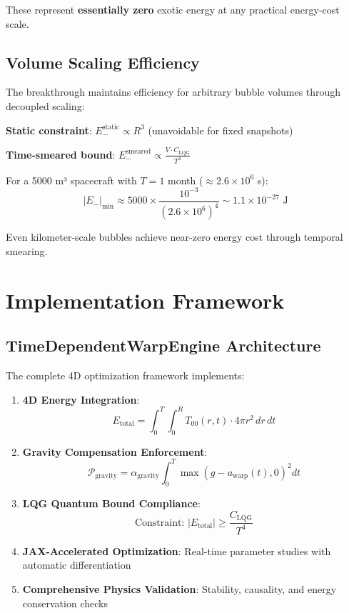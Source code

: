 \documentclass[12pt,a4paper]{article}
\begin{document}
These represent \textbf{essentially zero} exotic energy at any practical energy-cost scale.

\subsection{Volume Scaling Efficiency}

The breakthrough maintains efficiency for arbitrary bubble volumes through decoupled scaling:

\textbf{Static constraint}: $E_-^{\text{static}} \propto R^3$ (unavoidable for fixed snapshots)

\textbf{Time-smeared bound}: $E_-^{\text{smeared}} \propto \frac{V \cdot C_{\text{LQG}}}{T^4}$

For a 5000 m³ spacecraft with $T = 1$ month ($\approx 2.6 \times 10^6$ s):
\begin{equation}
|E_-|_{\min} \approx 5000 \times \frac{10^{-3}}{(2.6 \times 10^6)^4} \sim 1.1 \times 10^{-27} \text{ J}
\end{equation}

Even kilometer-scale bubbles achieve near-zero energy cost through temporal smearing.

\section{Implementation Framework}

\subsection{TimeDependentWarpEngine Architecture}

The complete 4D optimization framework implements:

\begin{enumerate}
\item \textbf{4D Energy Integration}:
\begin{equation}
E_{\text{total}} = \int_0^T \int_0^R T_{00}(r,t) \cdot 4\pi r^2 \, dr \, dt
\end{equation}

\item \textbf{Gravity Compensation Enforcement}:
\begin{equation}
\mathcal{P}_{\text{gravity}} = \alpha_{\text{gravity}} \int_0^T \max(g - a_{\text{warp}}(t), 0)^2 dt
\end{equation}

\item \textbf{LQG Quantum Bound Compliance}:
\begin{equation}
\text{Constraint: } |E_{\text{total}}| \geq \frac{C_{\text{LQG}}}{T^4}
\end{equation}

\item \textbf{JAX-Accelerated Optimization}: Real-time parameter studies with automatic differentiation

\item \textbf{Comprehensive Physics Validation}: Stability, causality, and energy conservation checks
\end{enumerate}
\end{document}

